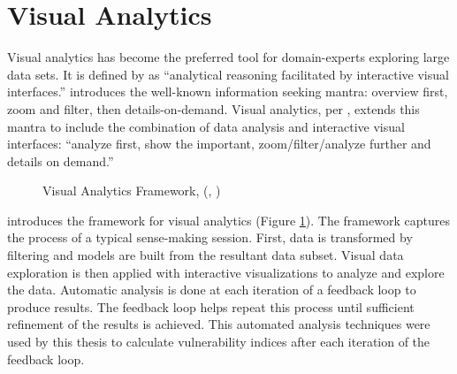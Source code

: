 \section{Visual Analytics}
Visual analytics has become the preferred tool for domain-experts exploring large data sets. It is defined by \cite{cook2005illuminating} as ``analytical reasoning facilitated by interactive visual interfaces.'' \cite{shneiderman1996eyes} introduces the well-known information seeking mantra: overview first, zoom and filter, then details-on-demand. Visual analytics, per \cite{keim2006challenges}, extends this mantra to include the combination of data analysis and interactive visual interfaces: ``analyze first, show the important, zoom/filter/analyze further and details on demand.''\par
	\begin{figure}[htb]
		\caption[VISUAL ANALYTICS FRAMEWORK]{Visual Analytics Framework, (\cite{keim2008visual}, \cite{kohlhammer2011solving})}
		\label{keim}
	\end{figure}
\cite{keim2008visual} introduces the framework for visual analytics (Figure \ref{keim}). The framework captures the process of a typical sense-making session. First, data is transformed by filtering and models are built from the resultant data subset. Visual data exploration is then applied with interactive visualizations to analyze and explore the data. Automatic analysis is done at each iteration of a feedback loop to produce results. The feedback loop helps repeat this process until sufficient refinement of the results is achieved. This automated analysis techniques were used by this thesis to calculate vulnerability indices after each iteration of the feedback loop.\par
